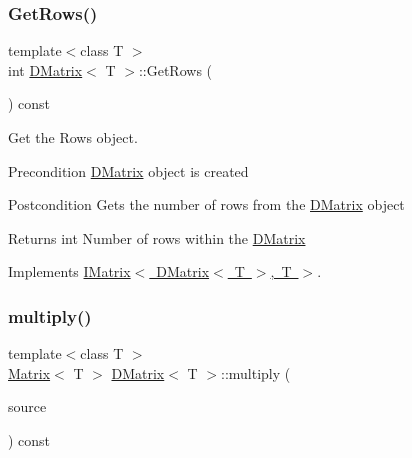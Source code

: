 \subsubsection{\texorpdfstring{GetRows()}{GetRows()}}
{\footnotesize\ttfamily template$<$class T $>$ \\
int \mbox{\hyperlink{class_d_matrix}{D\+Matrix}}$<$ T $>$\+::Get\+Rows (\begin{DoxyParamCaption}{ }\end{DoxyParamCaption}) const\hspace{0.3cm}{\ttfamily [virtual]}}



Get the Rows object. 

\begin{DoxyPrecond}{Precondition}
\mbox{\hyperlink{class_d_matrix}{D\+Matrix}} object is created 
\end{DoxyPrecond}
\begin{DoxyPostcond}{Postcondition}
Gets the number of rows from the \mbox{\hyperlink{class_d_matrix}{D\+Matrix}} object 
\end{DoxyPostcond}
\begin{DoxyReturn}{Returns}
int Number of rows within the \mbox{\hyperlink{class_d_matrix}{D\+Matrix}} 
\end{DoxyReturn}


Implements \mbox{\hyperlink{class_i_matrix_a58632b018f4023768db7963e22f468da}{I\+Matrix$<$ D\+Matrix$<$ T $>$, T $>$}}.

\mbox{\label{class_d_matrix_a399e3f1c303958f8eadb17e713da186d}} 
\subsubsection{\texorpdfstring{multiply()}{multiply()}\hspace{0.1cm}{\footnotesize\ttfamily [1/6]}}
{\footnotesize\ttfamily template$<$class T $>$ \\
\mbox{\hyperlink{class_matrix}{Matrix}}$<$ T $>$ \mbox{\hyperlink{class_d_matrix}{D\+Matrix}}$<$ T $>$\+::multiply (\begin{DoxyParamCaption}\item[{const \mbox{\hyperlink{class_i_matrix}{I\+Matrix}}$<$ \mbox{\hyperlink{class_matrix}{Matrix}}$<$ T $>$, T $>$ \&}]{source }\end{DoxyParamCaption}) const}



